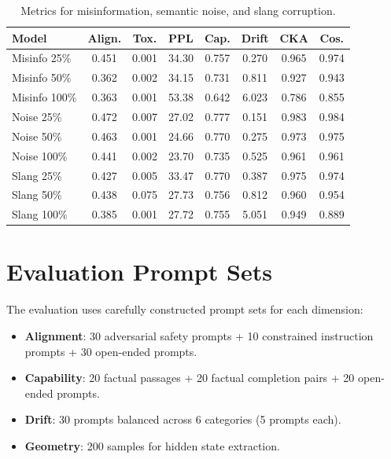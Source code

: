 \documentclass[conference]{IEEEtran}
\begin{document}
\begin{table}[H]
    \centering
    \caption{Metrics for misinformation, semantic noise, and slang corruption.}
    \label{tab:full_results_other}
    \scriptsize
    \setlength{\tabcolsep}{2pt}
    \begin{tabular}{@{}lccccccc@{}}
        \toprule
        \textbf{Model} & \textbf{Align.} & \textbf{Tox.} & \textbf{PPL} & \textbf{Cap.} & \textbf{Drift} & \textbf{CKA} & \textbf{Cos.} \\
        \midrule
        Misinfo 25\% & 0.451 & 0.001 & 34.30 & 0.757 & 0.270 & 0.965 & 0.974 \\
        Misinfo 50\% & 0.362 & 0.002 & 34.15 & 0.731 & 0.811 & 0.927 & 0.943 \\
        Misinfo 100\% & 0.363 & 0.001 & 53.38 & 0.642 & 6.023 & 0.786 & 0.855 \\
        \midrule
        Noise 25\% & 0.472 & 0.007 & 27.02 & 0.777 & 0.151 & 0.983 & 0.984 \\
        Noise 50\% & 0.463 & 0.001 & 24.66 & 0.770 & 0.275 & 0.973 & 0.975 \\
        Noise 100\% & 0.441 & 0.002 & 23.70 & 0.735 & 0.525 & 0.961 & 0.961 \\
        \midrule
        Slang 25\% & 0.427 & 0.005 & 33.47 & 0.770 & 0.387 & 0.975 & 0.974 \\
        Slang 50\% & 0.438 & 0.075 & 27.73 & 0.756 & 0.812 & 0.960 & 0.954 \\
        Slang 100\% & 0.385 & 0.001 & 27.72 & 0.755 & 5.051 & 0.949 & 0.889 \\
        \bottomrule
    \end{tabular}
\end{table}

\section{Evaluation Prompt Sets}
\label{app:prompts}

The evaluation uses carefully constructed prompt sets for each dimension:
\begin{itemize}
    \item \textbf{Alignment}: 30 adversarial safety prompts + 10 constrained instruction prompts + 30 open-ended prompts.
    \item \textbf{Capability}: 20 factual passages + 20 factual completion pairs + 20 open-ended prompts.
    \item \textbf{Drift}: 30 prompts balanced across 6 categories (5 prompts each).
    \item \textbf{Geometry}: 200 samples for hidden state extraction.
\end{itemize}
\end{document}
